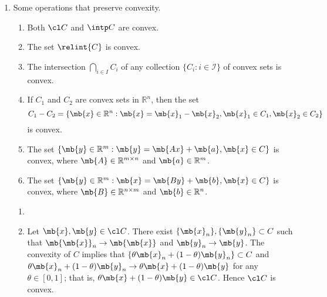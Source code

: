 \begin{exercise}
\begin{enumerate}
    \item  Some operations that preserve convexity.
      \begin{enumerate}
        \item
          Both $\cl C $ and $\intp C $ are convex.
        \item
          The set $\relint{C}$ is convex.
        \item
          The intersection $\bigcap_{i \in I}C_i$ of any collection $\{ C_i:i\in \mathcal{I} \}$ of convex sets is convex.
        \item
          If $C_1$ and $C_2$ are convex sets in $\mathbb{R}^n$, then the set
          $$
            C_1-C_2=\{ \mb{x}\in\mathbb{R}^n:\mb{x}=\mb{x}_1-\mb{x}_2, \mb{x}_1\in C_1,\mb{x}_2\in C_2\}
          $$
          is convex.
        \item
          The set $\{ \mb{y}\in\mathbb{R}^m:\mb{y}=\mb{Ax}+\mb{a},\mb{x}\in C \}$ is convex, where $\mb{A} \in \mathbb{R}^{m \times n}$ and $\mb{a} \in \mathbb{R}^m$.
        \item
          The set $\{ \mb{y}\in\mathbb{R}^m:\mb{x}=\mb{By}+\mb{b},\mb{x}\in C \}$ is convex, where $\mb{B} \in \mathbb{R}^{n \times m}$ and $\mb{b} \in \mathbb{R}^n$.
      \end{enumerate}

      \begin{solution}
        \begin{enumerate}
          \item []
          \item 
            Let $\mb{x}, \mb{y} \in \cl C$. There exist $\{\mb{x}_n\}, \{\mb{y}_n\} \subset C$ such that $\mb{\mb{x}}_n \to \mb{\mb{x}}$ and $\mb{y}_n \to \mb{y}$. The convexity of $C$ implies that $\{\theta \mb{x}_n + (1-\theta) \mb{y}_n\}\subset C$ and $\theta \mb{x}_n + (1-\theta) \mb{y}_n \to \theta \mb{x} + (1-\theta) \mb{y}$ for any $\theta \in [0,1]$; that is, $\theta \mb{x} + (1-\theta) \mb{y} \in \cl C$. Hence $\cl C$ is convex.


\end{enumerate}
\end{solution}
\end{enumerate}
\end{exercise}
